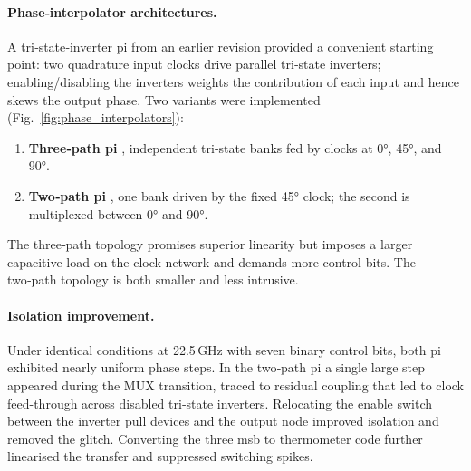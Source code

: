 \paragraph{Phase‑interpolator architectures.} A tri‑state‑inverter \gls{pi} from an earlier revision provided a convenient starting point: two quadrature input clocks drive parallel tri‑state inverters; enabling/disabling the inverters weights the contribution of each input and hence skews the output phase. Two variants were implemented (Fig.~\ref{fig:phase_interpolators}):
\begin{enumerate}
\item \textbf{Three‑path \gls{pi}} ,  independent tri‑state banks fed by clocks at \ang{0}, \ang{45}, and \ang{90}.
\item \textbf{Two‑path \gls{pi}} ,  one bank driven by the fixed \ang{45} clock; the second is multiplexed between \ang{0} and \ang{90}.
\end{enumerate}
The three‑path topology promises superior linearity but imposes a larger capacitive load on the clock network and demands more control bits. The two‑path topology is both smaller and less intrusive.
\paragraph{Isolation improvement.} Under identical conditions at 22.5\,GHz with seven binary control bits, both \gls{pi} exhibited nearly uniform phase steps. In the two‑path \gls{pi} a single large step appeared during the MUX transition, traced to residual coupling that led to clock feed-through across disabled tri‑state inverters. Relocating the enable switch between the inverter pull devices and the output node improved isolation and removed the glitch. Converting the three \gls{msb} to thermometer code further linearised the transfer and suppressed switching spikes.
